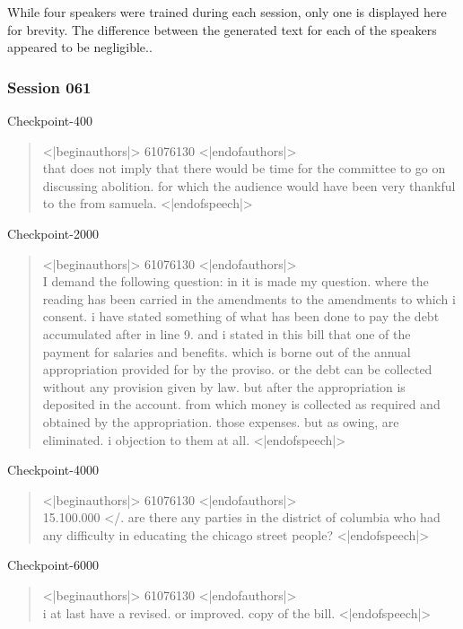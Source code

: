 \documentclass[11pt]{article}
\begin{document}
While four speakers were trained during each session, only one is displayed here for brevity. The
difference between the generated text for each of the speakers appeared to be negligible..

\subsubsection{Session 061}
\label{sec:org3240e26}

Checkpoint-400

\begin{quote}
<|beginauthors|> 61076130 <|endofauthors|> \\
that does not imply that there would be time for the committee to go on discussing abolition. for which the audience would have been very thankful to the  from samuela. <|endofspeech|>
\end{quote}

\noindent 
Checkpoint-2000

\begin{quote}
<|beginauthors|> 61076130 <|endofauthors|> \\
I demand the following question:   in  it is made my question. where the reading has been carried in the amendments to the amendments to which i consent. i have stated something of what has been done to pay the debt accumulated after in line 9. and i stated in this bill that one of the payment for salaries and benefits. which is borne out of the annual appropriation provided for by the proviso. or the debt can be collected without any provision given by law. but after the appropriation is deposited in the account. from which money is collected as required and obtained by the appropriation. those expenses. but as owing, are eliminated. i  objection to them at all. <|endofspeech|> 
\end{quote}

\noindent 
Checkpoint-4000

\begin{quote}
<|beginauthors|> 61076130 <|endofauthors|> \\
15.100.000 </. are there any parties in the district of columbia who had any difficulty in educating the chicago street people? <|endofspeech|>
\end{quote}

\noindent 
Checkpoint-6000

\begin{quote}
<|beginauthors|> 61076130 <|endofauthors|> \\
i at last have a revised. or improved. copy of the bill. <|endofspeech|>
\end{quote}
\end{document}
